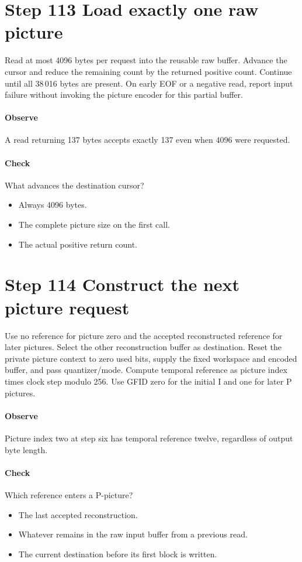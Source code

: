 \section{Step 113 Load exactly one raw picture}\label{h263-clip-s03}
Read at most 4096 bytes per request into the reusable raw buffer. Advance the
cursor and reduce the remaining count by the returned positive count. Continue
until all 38\,016 bytes are present. On early EOF or a negative read, report input
failure without invoking the picture encoder for this partial buffer.

\paragraph{Observe} A read returning 137 bytes accepts exactly 137 even when 4096 were requested.
\paragraph{Check} What advances the destination cursor?
\begin{itemize}
  \item[A.] Always 4096 bytes.
  \item[B.] The complete picture size on the first call.
  \item[C.] The actual positive return count.
\end{itemize}

\section{Step 114 Construct the next picture request}\label{h263-clip-s04}
Use no reference for picture zero and the accepted reconstructed reference for
later pictures. Select the other reconstruction buffer as destination. Reset the
private picture context to zero used bits, supply the fixed workspace and encoded
buffer, and pass quantizer/mode. Compute temporal reference as picture index times
clock step modulo 256. Use GFID zero for the initial I and one for later P pictures.

\paragraph{Observe} Picture index two at step six has temporal reference twelve, regardless of output byte length.
\paragraph{Check} Which reference enters a P-picture?
\begin{itemize}
  \item[A.] The last accepted reconstruction.
  \item[B.] Whatever remains in the raw input buffer from a previous read.
  \item[C.] The current destination before its first block is written.
\end{itemize}

